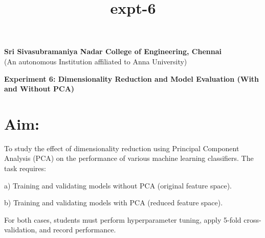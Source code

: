 \documentclass[11pt]{article}
\title{expt-6}
\begin{document}
    
    \begin{center}
    \large \textbf{Sri Sivasubramaniya Nadar College of Engineering, Chennai} \\
    (An autonomous Institution affiliated to Anna University) \\
    \vspace{0.3cm}
\end{center}

\begin{table}[!h]
\renewcommand{\arraystretch}{1.5}
\end{table}

\vspace{0.5cm}

\begin{center}
 \textbf{Experiment 6: Dimensionality Reduction and Model
 Evaluation (With and Without PCA)}
\end{center}

\vspace{0.3cm}
\noindent
\section{Aim:} 
  To study the effect of dimensionality reduction using Principal Component Analysis (PCA) on the performance of various machine learning classifiers. The task requires:
 
 a) Training and validating models without PCA (original feature space).
 
 b) Training and validating models with PCA (reduced feature space).
 
 For both cases, students must perform hyperparameter tuning, apply 5-fold cross-validation, and record performance.
\end{document}

